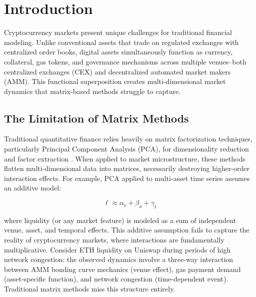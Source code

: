 \documentclass[11pt,twocolumn]{article}
\begin{document}
\clearpage
\tableofcontents

\clearpage
\twocolumn
{}  %


\section{Introduction}
\label{sec:introduction}

Cryptocurrency markets present unique challenges for traditional financial modeling. Unlike conventional assets that trade on regulated exchanges with centralized order books, digital assets simultaneously function as currency, collateral, gas tokens, and governance mechanisms across multiple venues--both centralized exchanges (CEX) and decentralized automated market makers (AMM). This functional superposition creates multi-dimensional market dynamics that matrix-based methods struggle to capture.

\subsection{The Limitation of Matrix Methods}

Traditional quantitative finance relies heavily on matrix factorization techniques, particularly Principal Component Analysis (PCA), for dimensionality reduction and factor extraction \citep{Cont2001Empirical,Fan2013Large}. When applied to market microstructure, these methods flatten multi-dimensional data into matrices, necessarily destroying higher-order interaction effects. For example, PCA applied to multi-asset time series assumes an additive model:

$$\ell \approx \alpha_{v} + \beta_{a} + \gamma_{t}$$

where liquidity (or any market feature) is modeled as a sum of independent venue, asset, and temporal effects. This additive assumption fails to capture the reality of cryptocurrency markets, where interactions are fundamentally multiplicative. Consider ETH liquidity on Uniswap during periods of high network congestion: the observed dynamics involve a three-way interaction between AMM bonding curve mechanics (venue effect), gas payment demand (asset-specific function), and network congestion (time-dependent event). Traditional matrix methods miss this structure entirely.
\end{document}
